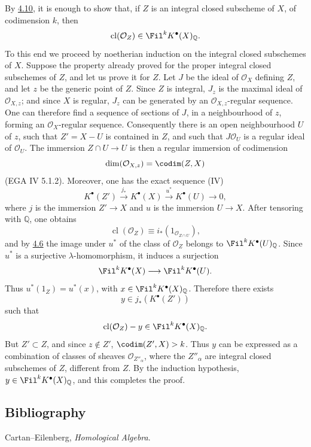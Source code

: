 By \hyperlink{sga6.e07.sec.4.10}{4.10}, it is enough to show that, if \(Z\) is an integral closed subscheme of \(X\), of codimension \(k\), then
\[
  \operatorname{cl}(\mathcal O_Z)\in\Fil^kK^\bullet(X)_{\mathbb Q}.
\]
To this end we proceed by noetherian induction on the integral closed subschemes of \(X\). Suppose the property already proved for the proper integral closed subschemes of \(Z\), and let us prove it for \(Z\). Let \(J\) be the ideal of \(\mathcal O_X\) defining \(Z\), and let \(z\) be the generic point of \(Z\). Since \(Z\) is integral, \(J_z\) is the maximal ideal of \(\mathcal O_{X,z}\); and since \(X\) is regular, \(J_z\) can be generated by an \(\mathcal O_{X,z}\)-regular sequence. One can therefore find a sequence of sections of \(J\), in a neighbourhood of \(z\), forming an \(\mathcal O_X\)-regular sequence. Consequently there is an open neighbourhood \(U\) of \(z\), such that \(Z'=X-U\) is contained in \(Z\), and such that \(J\mathcal O_U\) is a regular ideal of \(\mathcal O_U\). The immersion \(Z\cap U\to U\) is then a regular immersion of codimension
\[
  \dim(\mathcal O_{X,z})=\codim(Z,X)
\]
(EGA IV 5.1.2). Moreover, one has the exact sequence (IV)
\[
  K^\bullet(Z')\xrightarrow{j_*}K^\bullet(X)
  \xrightarrow{u^*}K^\bullet(U)\to0,
\]
where \(j\) is the immersion \(Z'\to X\) and \(u\) is the immersion \(U\to X\). After tensoring with \(\mathbb Q\), one obtains
\[
  \operatorname{cl}(\mathcal O_Z)
  \equiv i_*(1_{\mathcal O_{Z\cap U}}),
\]
and by \hyperlink{sga6.e07.thm.4-6}{4.6} the image under \(u^*\) of the class of \(\mathcal O_Z\) belongs to \(\Fil^kK^\bullet(U)_{\mathbb Q}\). Since \(u^*\) is a surjective \(\lambda\)-homomorphism, it induces a surjection
\[
  \Fil^kK^\bullet(X)\longrightarrow \Fil^kK^\bullet(U).
\]
Thus \(u^*(1_Z)=u^*(x)\), with \(x\in\Fil^kK^\bullet(X)_{\mathbb Q}\). Therefore there exists
\[
  y\in j_*(K^\bullet(Z'))
\]
such that
\[
  \operatorname{cl}(\mathcal O_Z)-y\in\Fil^kK^\bullet(X)_{\mathbb Q}.
\]
But \(Z'\subset Z\), and since \(z\notin Z'\), \(\codim(Z',X)>k\). Thus \(y\) can be expressed as a combination of classes of sheaves \(\mathcal O_{Z''_\alpha}\), where the \(Z''_\alpha\) are integral closed subschemes of \(Z\), different from \(Z\). By the induction hypothesis, \(y\in\Fil^kK^\bullet(X)_{\mathbb Q}\), and this completes the proof.

\subsection*{Bibliography}
\begin{enumerate}[label={[\arabic*]}]
\item Cartan--Eilenberg, \emph{Homological Algebra}.
\end{enumerate}




